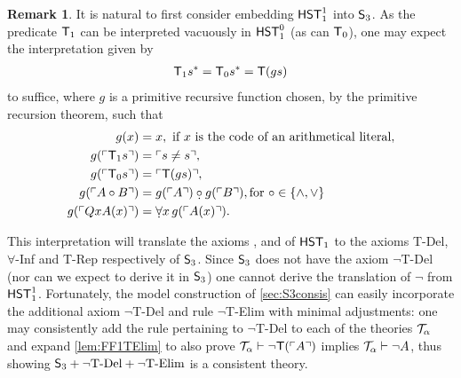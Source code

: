 \documentclass[UKenglish,cleveref,DIV=12]{scrartcl}
\theoremstyle{definition}
\theoremstyle{definition}
\newtheorem{remark}{Remark}
\begin{document}
\begin{remark}\label{rem:S3} It is natural to first consider embedding
$\mathsf{HST}_1^1$ into $\mathsf{S}_3$. As the predicate $\mathsf{T}_1$ can be interpreted vacuously
in $\mathsf{HST}_1^0$ (as can $\mathsf{T}_0$), one may expect the interpretation given by
\begin{align*}
 \mathsf{T}_1 s^*=\mathsf{T}_0 s^*= \mathsf{T}(g s)
\end{align*}
to suffice, where $g$ is a primitive recursive function chosen, by the primitive recursion theorem, such that
\begin{align*}
 g(x)&=x, \text{ if $x$ is the code of an arithmetical literal},\\
 g(\gn{\T_1 s})&=\gn{s\neq s},\\
 g(\gn{\T_0 s})&=\gn{\T(g s)},\\
 g(\gn{A\mathbin\circ B})&=g(\gn A)\mathbin{\subdot\circ} g(\gn B), \text{for $\circ\in\{\land,\lor\}$}\\
 g(\gn{QxA(x)})&=\dfa x\, g(\gn{A(x)}).
\end{align*}

This interpretation will translate the axioms , 
and  of $\mathsf{HST}_1$ to the axioms T-Del, $\forall$-Inf and T-Rep
respectively of $\mathsf{S}_3$. Since $\mathsf{S}_3$ does not have the axiom
$\lnot$T-Del (nor can we expect to derive it in $\mathsf{S}_3$) one cannot derive
the translation of $\lnot$ from $\mathsf{HST}_1^1$. Fortunately, the model
construction of \cref{sec:S3consis} can easily incorporate the additional
axiom $\lnot$T-Del and rule $\lnot$T-Elim with minimal adjustments: one
may consistently add the rule pertaining to $\lnot$T-Del to each of the theories
$\mathcal{T}_\alpha$ and expand \cref{lem:FF1TElim} to also prove $\mathcal{T}_\alpha\vdash\lnot
\mathsf{T}(\ulcorner{A}\urcorner)$ implies $\mathcal{T}_\alpha\vdash\lnot A$, thus showing $\mathsf{S}_3+\text{$\lnot$T-Del}+\text{$\lnot$T-Elim}$ is a consistent theory.


\end{remark}
\end{document}
